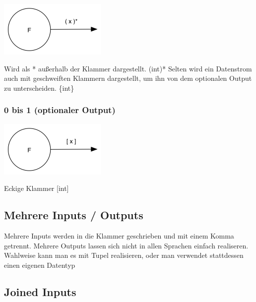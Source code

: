 \documentclass[11pt]{article}
\begin{document}
\includegraphics[width=.9\linewidth]{./img/diagram0n.png}

Wird als * außerhalb der Klammer dargestellt.
(int)*
Selten wird ein Datenstrom auch mit geschweiften Klammern dargestellt, um ihn von dem optionalen Output zu unterscheiden.
\{int\}

\subsubsection{0 bis 1 (optionaler Output)}
\label{sec:orgheadline10}

\includegraphics[width=.9\linewidth]{./img/diagramOptional.png}

Eckige Klammer
[int]

\subsection{Mehrere Inputs / Outputs}
\label{sec:orgheadline12}
Mehrere Inputs werden in die Klammer geschrieben und mit einem Komma getrennt.
Mehrere Outputs lassen sich nicht in allen Sprachen einfach realiseren.
Wahlweise kann man es mit Tupel realisieren, oder man verwendet stattdessen einen eigenen Datentyp

\subsection{Joined Inputs}
\label{sec:orgheadline13}
\end{document}
